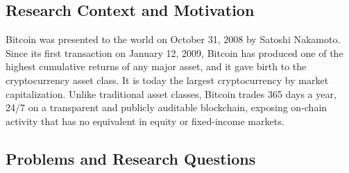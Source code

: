 \documentclass[12pt,a4paper,oneside]{article}
\begin{document}
\subsection{Research Context and Motivation}\label{subsec:context}

Bitcoin was presented to the world on October 31, 2008 by Satoshi Nakamoto. Since its first transaction on January 12, 2009, Bitcoin has produced one of the highest cumulative returns of any major asset, and it gave birth to the cryptocurrency asset class. It is today the largest cryptocurrency by market capitalization. Unlike traditional asset classes, Bitcoin trades 365 days a year, 24/7 on a transparent and publicly auditable blockchain, exposing on-chain activity that has no equivalent in equity or fixed-income markets.
%
%
%
%


\subsection{Problems and Research Questions}\label{subsec:objectives}
\end{document}
